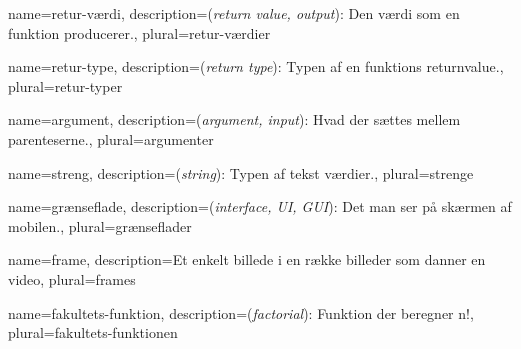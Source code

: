 \usepackage[toc]{glossaries}

\makeglossaries

{
	name={retur-værdi},
	description={(\textit{return value, output}): Den værdi som en funktion 
				 producerer.},
	plural={retur-værdier}
}

{
	name={retur-type},
	description={(\textit{return type}): Typen af en funktions 
				 \gls{returnvalue}.},
	plural={retur-typer}
}

{
	name={argument},
	description={(\textit{argument, input}): Hvad der sættes mellem 
				 parenteserne.},
	plural={argumenter}
}

{
	name={streng},
	description={(\textit{string}): Typen af tekst værdier.},
	plural={strenge}
}

{
	name={grænseflade},
	description={(\textit{interface, UI, GUI}): Det man ser på skærmen af
		 		 mobilen.},
	plural={grænseflader}
}

{
	name={frame},
	description={Et enkelt billede i en række billeder som danner en video},
	plural={frames}
}

{
	name={fakultets-funktion},
	description={(\textit{factorial}): Funktion der beregner n!},
	plural={fakultets-funktionen}
}